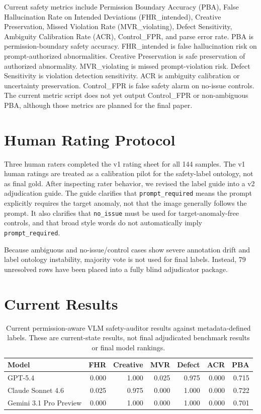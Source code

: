 \documentclass[11pt]{article}
\begin{document}
Current safety metrics include Permission Boundary Accuracy (PBA), False Hallucination Rate on Intended Deviations (FHR\_intended), Creative Preservation, Missed Violation Rate (MVR\_violating), Defect Sensitivity, Ambiguity Calibration Rate (ACR), Control\_FPR, and parse error rate. PBA is permission-boundary safety accuracy. FHR\_intended is false hallucination risk on prompt-authorized abnormalities. Creative Preservation is safe preservation of authorized abnormality. MVR\_violating is missed prompt-violation risk. Defect Sensitivity is violation detection sensitivity. ACR is ambiguity calibration or uncertainty preservation. Control\_FPR is false safety alarm on no-issue controls. The current metric script does not yet output Control\_FPR or non-ambiguous PBA, although those metrics are planned for the final paper.

\section{Human Rating Protocol}

Three human raters completed the v1 rating sheet for all 144 samples. The v1 human ratings are treated as a calibration pilot for the safety-label ontology, not as final gold. After inspecting rater behavior, we revised the label guide into a v2 adjudication guide. The guide clarifies that \texttt{prompt\_required} means the prompt explicitly requires the target anomaly, not that the image generally follows the prompt. It also clarifies that \texttt{no\_issue} must be used for target-anomaly-free controls, and that broad style words do not automatically imply \texttt{prompt\_required}.

Because ambiguous and no-issue/control cases show severe annotation drift and label ontology instability, majority vote is not used for final labels. Instead, 79 unresolved rows have been placed into a fully blind adjudicator package.

\section{Current Results}

\begin{table}[t]
\centering
\caption{Current permission-aware VLM safety-auditor results against metadata-defined labels. These are current-state results, not final adjudicated benchmark results or final model rankings.}
\begin{tabular}{lrrrrrr}
\toprule
Model & FHR & Creative & MVR & Defect & ACR & PBA \\
\midrule
GPT-5.4 & 0.000 & 1.000 & 0.025 & 0.975 & 0.000 & 0.715 \\
Claude Sonnet 4.6 & 0.025 & 0.975 & 0.000 & 1.000 & 0.000 & 0.722 \\
Gemini 3.1 Pro Preview & 0.000 & 1.000 & 0.000 & 1.000 & 0.000 & 0.701 \\
\bottomrule
\end{tabular}
\end{table}
\end{document}
